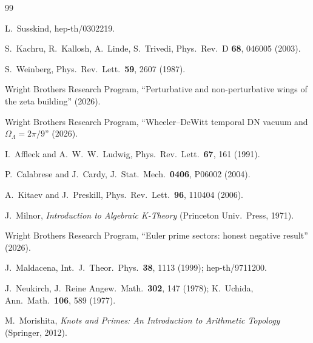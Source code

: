 \documentclass[11pt,a4paper]{article}
\begin{document}
\begin{thebibliography}{99}

L.~Susskind, hep-th/0302219.

S.~Kachru, R.~Kallosh, A.~Linde, S.~Trivedi,
Phys.\ Rev.\ D \textbf{68}, 046005 (2003).

S.~Weinberg, Phys.\ Rev.\ Lett.\ \textbf{59}, 2607 (1987).

Wright Brothers Research Program,
``Perturbative and non-perturbative wings of the zeta building''
(2026).

Wright Brothers Research Program,
``Wheeler--DeWitt temporal DN vacuum and $\Omega_\Lambda = 2\pi/9$''
(2026).

I.~Affleck and A.~W.~W.~Ludwig,
Phys.\ Rev.\ Lett.\ \textbf{67}, 161 (1991).

P.~Calabrese and J.~Cardy,
J.\ Stat.\ Mech.\ \textbf{0406}, P06002 (2004).

A.~Kitaev and J.~Preskill,
Phys.\ Rev.\ Lett.\ \textbf{96}, 110404 (2006).

J.~Milnor, \textit{Introduction to Algebraic K-Theory}
(Princeton Univ.\ Press, 1971).

Wright Brothers Research Program,
``Euler prime sectors: honest negative result'' (2026).

J.~Maldacena,
Int.\ J.\ Theor.\ Phys.\ \textbf{38}, 1113 (1999);
hep-th/9711200.

J.~Neukirch, J.\ Reine Angew.\ Math.\ \textbf{302}, 147 (1978);
K.~Uchida, Ann.\ Math.\ \textbf{106}, 589 (1977).

M.~Morishita,
\textit{Knots and Primes: An Introduction to Arithmetic Topology}
(Springer, 2012).

\end{thebibliography}
\end{document}
